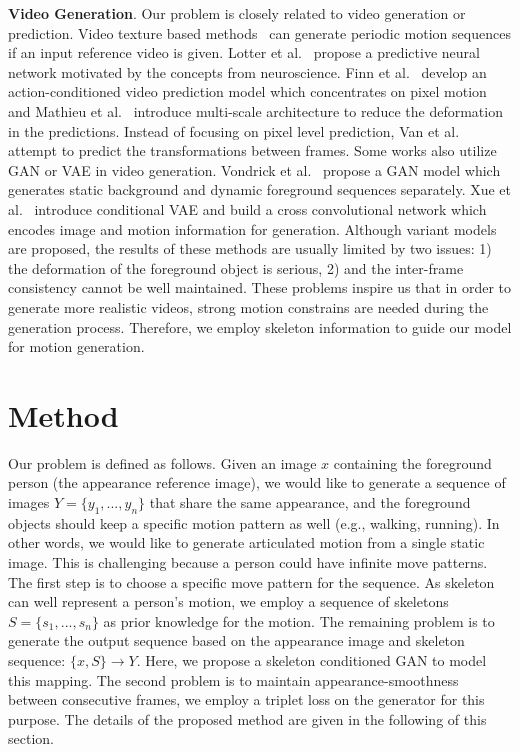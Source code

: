 \documentclass[journal]{IEEEtran}
\begin{document}
\textbf{Video Generation}. Our problem is closely related to video generation or prediction.
Video texture based methods~\cite{schodl2000video,agarwala2005panoramic,liao2013automated} can generate periodic motion sequences if an input reference video is given.
Lotter et al.~\cite{DBLP:journals/corr/LotterKC16} propose a predictive neural network motivated by the concepts from neuroscience.
Finn et al.~\cite{finn2016unsupervised} develop an action-conditioned video prediction model which concentrates on pixel motion and Mathieu et al.~\cite{DBLP:journals/corr/MathieuCL15} introduce multi-scale architecture to reduce the deformation in the predictions. Instead of focusing on pixel level prediction, Van et al.~\cite{van2017transformation} attempt to predict the transformations between frames. Some works also utilize GAN or VAE in video generation. Vondrick et al.~\cite{DBLP:conf/nips/VondrickPT16} propose a GAN model which generates static background and dynamic foreground sequences separately. Xue et al.~\cite{xue2016visual} introduce conditional VAE and build a cross convolutional network which encodes image and motion information for generation. Although variant models are proposed, the results of these methods are usually limited by two issues: 1) the deformation of the foreground object is serious, 2) and the inter-frame consistency cannot be well maintained. These problems inspire us that in order to generate more realistic videos, strong motion constrains are needed during the generation process. Therefore, we employ skeleton information to guide our model for motion generation.



\section{Method}
Our problem is defined as follows. Given an image $x$ containing the foreground person (the appearance reference image), we would like to generate a sequence of images $Y=\{y_1,..., y_n\}$ that share the same appearance, and the foreground objects should keep a specific motion pattern as well (e.g., walking, running). In other words, we would like to generate articulated motion from a single static image.
This is challenging because a person could have infinite move patterns. The first step is to choose a specific move pattern for the sequence. As skeleton can well represent a person's motion, we employ a sequence of skeletons $S=\{s_1,..., s_n\}$ as prior knowledge for the motion. The remaining problem is to generate the output sequence based on the appearance image and skeleton sequence: $\{x,S\} \rightarrow Y$. Here, we propose a skeleton conditioned GAN to model this mapping.
The second problem is to maintain appearance-smoothness between consecutive frames, we employ a triplet loss on the generator for this purpose.
The details of the proposed method are given in the following of this section.
\end{document}
